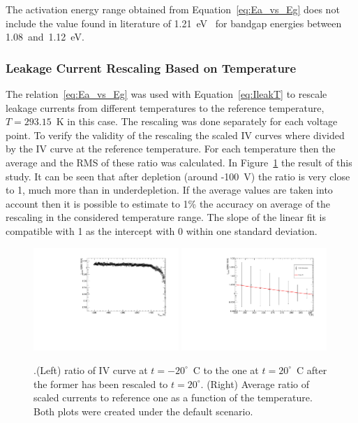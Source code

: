 The activation energy range obtained from Equation~\ref{eq:Ea_vs_Eg} does not include 
the value found in literature of 1.21~eV~\cite{Chilingarov_tscale} for bandgap energies between 
1.08~and~1.12~eV.

\subsubsection{Leakage Current Rescaling Based on Temperature}

The relation~\ref{eq:Ea_vs_Eg} was  used with Equation~\ref{eq:IleakT} to rescale 
leakage currents from different temperatures to the reference temperature, $T=293.15$~K 
in this case. The rescaling was done separately for each voltage point. 
 To verify the validity of the rescaling the scaled IV curves 
where divided by the IV curve at the reference temperature. For each 
temperature then the average and the RMS  of these ratio was calculated. 
In Figure~\ref{fig:scaling} the result of this study. It can be seen that after depletion (around -100~V) 
the ratio is very close to 1, much more than in underdepletion. 
If the average values are taken into account then it is possible to estimate to 1\% the accuracy 
on average of the rescaling in the considered temperature range. The slope of the linear fit 
is compatible with 1 as the intercept with 0 within one standard deviation.



\begin{figure}[!htbp]
\centering
\includegraphics[width=0.49\textwidth]{default/scaled_ratio_T-20.pdf}
\includegraphics[width=0.49\textwidth]{default/scaling.pdf}
\caption{\label{fig:scaling}.(Left) ratio of IV curve at $t=-20^{\circ}$~C to the one at $t=20^{\circ}$~C 
after the former has been rescaled to $t=20^{\circ}$. (Right) Average ratio of scaled currents to reference one as a function of the temperature. Both plots were created under the default scenario.}
\end{figure}


